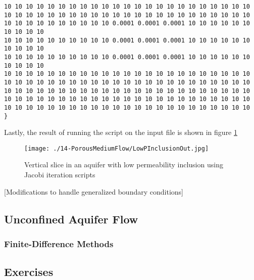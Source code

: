 \begin{lstlisting}[caption= Input file for 2D vertical slice confined aquifer with low permeability inclusion , label=lst:2DinclusionInput]
10 10 10 10 10 10 10 10 10 10 10 10 10 10 10 10 10 10 10 10 10 10 10
10 10 10 10 10 10 10 10 10 10 10 10 10 10 10 10 10 10 10 10 10 10 10
10 10 10 10 10 10 10 10 10 10 0.0001 0.0001 0.0001 10 10 10 10 10 10 10 10 10 10
10 10 10 10 10 10 10 10 10 10 0.0001 0.0001 0.0001 10 10 10 10 10 10 10 10 10 10
10 10 10 10 10 10 10 10 10 10 0.0001 0.0001 0.0001 10 10 10 10 10 10 10 10 10 10
10 10 10 10 10 10 10 10 10 10 10 10 10 10 10 10 10 10 10 10 10 10 10
10 10 10 10 10 10 10 10 10 10 10 10 10 10 10 10 10 10 10 10 10 10 10
10 10 10 10 10 10 10 10 10 10 10 10 10 10 10 10 10 10 10 10 10 10 10
10 10 10 10 10 10 10 10 10 10 10 10 10 10 10 10 10 10 10 10 10 10 10
10 10 10 10 10 10 10 10 10 10 10 10 10 10 10 10 10 10 10 10 10 10 10
}\end{lstlisting}

Lastly, the result of running the script on the input file is shown in figure \ref{fig:LowPInclusionOut}

\begin{figure}[h!] %
   \centering
   \texttt{[image: ./14-PorousMediumFlow/LowPInclusionOut.jpg]} 
   \caption{Vertical slice in an aquifer with low permeability inclusion using Jacobi iteration scripts}
   \label{fig:LowPInclusionOut}
\end{figure}

[Modifications to handle generalized boundary conditions]



\clearpage
\subsection{Unconfined Aquifer Flow}
\subsubsection{Finite-Difference Methods}
\subsection{Exercises}
